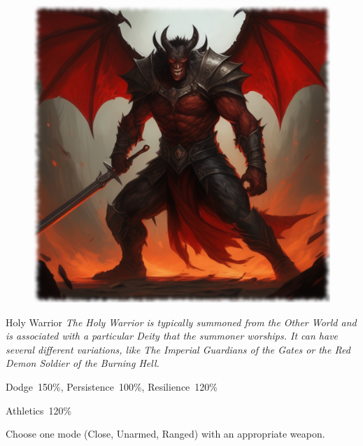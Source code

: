 
\begin{figure}[h]
\begin{center}
\includegraphics[scale=0.24]{img/ai-images/demon.png}
\end{center}
\end{figure}
\begin{monsterbox}{Holy Warrior}
	\label{monster:holy-warrior}
	\textit{The Holy Warrior is typically summoned from the Other World and is associated with a particular Deity that the summoner worships. It can have several different variations, like The Imperial Guardians of the Gates or the Red Demon Soldier of the Burning Hell.}\\
	\rpghline
	\basics[%
        hitpoints  = 18,
	majorwound = 9,
	damagemodifier = +1D6,
	powerpoints = 18,
	movementrate = 12m,
	armor = Special (6AP),
	plunderrating = 0
	]
	\rpghline%
	\stats[ %
		STR = 20,
		CON = 18,
		DEX = 15,
		SIZ = 18,
		INT = 15,
		POW = 18,
		CHA = 18
	]
	\rpghline%
	\begin{rpg-monsteraction}[Resistances]
		Dodge~150\%, Persistence~100\%, Resilience~120\%
	\end{rpg-monsteraction}
	\begin{rpg-monsteraction}[Practical]
		Athletics~120\%
	\end{rpg-monsteraction}
	\begin{rpg-monsteraction}[Combat 150\%]
		Choose one mode (Close, Unarmed, Ranged) with an appropriate weapon.
	\end{rpg-monsteraction}
\end{monsterbox}

